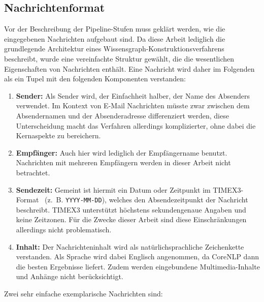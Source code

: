 \subsection{Nachrichtenformat}%
\label{sec:text2kg:nlp:msg}

Vor der Beschreibung der Pipeline-Stufen muss geklärt werden, wie die eingegebenen Nachrichten aufgebaut sind.
Da diese Arbeit lediglich die grundlegende Architektur eines Wissensgraph-Konstruktionsverfahrens beschreibt, wurde eine vereinfachte Struktur gewählt, die die wesentlichen Eigenschaften von Nachrichten enthält.
Eine Nachricht wird daher im Folgenden als ein Tupel mit den folgenden Komponenten verstanden:
\begin{enumerate}
	\item \textbf{Sender:}
		Als Sender wird, der Einfachheit halber, der Name des Absenders verwendet.
		Im Kontext von E-Mail Nachrichten müsste zwar zwischen dem Absendernamen und der Absenderadresse differenziert werden, diese Unterscheidung macht das Verfahren allerdings komplizierter, ohne dabei die Kernaspekte zu bereichern.
	\item \textbf{Empfänger:}
		Auch hier wird lediglich der Empfängername benutzt.
		Nachrichten mit mehreren Empfängern werden in dieser Arbeit nicht betrachtet.
	\item \textbf{Sendezeit:}
		Gemeint ist hiermit ein Datum oder Zeitpunkt im TIMEX3-Format~\cite{TIMEX3} (z.~B. \texttt{YYYY-MM-DD}), welches den Absendezeitpunkt der Nachricht beschreibt.
		TIMEX3 unterstützt höchstens sekundengenaue Angaben und keine Zeitzonen.
		Für die Zwecke dieser Arbeit sind diese Einschränkungen allerdings nicht problematisch.
	\item \textbf{Inhalt:}
		Der Nachrichteninhalt wird als natürlichsprachliche Zeichenkette verstanden.
		Als Sprache wird dabei Englisch angenommen, da CoreNLP dann die besten Ergebnisse liefert.
		Zudem werden eingebundene Multimedia-Inhalte und Anhänge nicht berücksichtigt.
\end{enumerate}

Zwei sehr einfache exemplarische Nachrichten sind:
\begin{center}\end{center}

